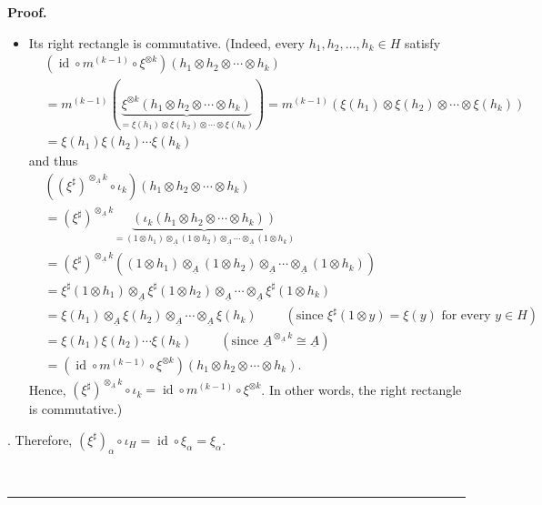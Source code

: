 \documentclass
[numbers=enddot,12pt,final,onecolumn,notitlepage,abstracton]{scrartcl}%
\theoremstyle{definition}
\newenvironment{proof}[1][Proof]{\noindent\textbf{#1.} }{\ \rule{0.5em}{0.5em}}
\begin{document}
\begin{proof}
{\begin{itemize}
\par
\item Its right rectangle is commutative. (Indeed, every $h_{1},h_{2}%
,\ldots,h_{k}\in H$ satisfy%
\begin{align*}
&  \left(  \operatorname*{id}\circ m^{\left(  k-1\right)  }\circ\xi^{\otimes
k}\right)  \left(  h_{1}\otimes h_{2}\otimes\cdots\otimes h_{k}\right) \\
&  =m^{\left(  k-1\right)  }\left(  \underbrace{\xi^{\otimes k}\left(
h_{1}\otimes h_{2}\otimes\cdots\otimes h_{k}\right)  }_{=\xi\left(
h_{1}\right)  \otimes\xi\left(  h_{2}\right)  \otimes\cdots\otimes\xi\left(
h_{k}\right)  }\right)  =m^{\left(  k-1\right)  }\left(  \xi\left(
h_{1}\right)  \otimes\xi\left(  h_{2}\right)  \otimes\cdots\otimes\xi\left(
h_{k}\right)  \right) \\
&  =\xi\left(  h_{1}\right)  \xi\left(  h_{2}\right)  \cdots\xi\left(
h_{k}\right)
\end{align*}
and thus%
\begin{align*}
&  \left(  \left(  \xi^{\sharp}\right)  ^{\otimes_{\underline{A}}k}\circ
\iota_{k}\right)  \left(  h_{1}\otimes h_{2}\otimes\cdots\otimes h_{k}\right)
\\
&  =\left(  \xi^{\sharp}\right)  ^{\otimes_{\underline{A}}k}%
\underbrace{\left(  \iota_{k}\left(  h_{1}\otimes h_{2}\otimes\cdots\otimes
h_{k}\right)  \right)  }_{=\left(  1\otimes h_{1}\right)  \otimes
_{\underline{A}}\left(  1\otimes h_{2}\right)  \otimes_{\underline{A}}%
\cdots\otimes_{\underline{A}}\left(  1\otimes h_{k}\right)  }\\
&  =\left(  \xi^{\sharp}\right)  ^{\otimes_{\underline{A}}k}\left(  \left(
1\otimes h_{1}\right)  \otimes_{\underline{A}}\left(  1\otimes h_{2}\right)
\otimes_{\underline{A}}\cdots\otimes_{\underline{A}}\left(  1\otimes
h_{k}\right)  \right) \\
&  =\xi^{\sharp}\left(  1\otimes h_{1}\right)  \otimes_{\underline{A}}%
\xi^{\sharp}\left(  1\otimes h_{2}\right)  \otimes_{\underline{A}}%
\cdots\otimes_{\underline{A}}\xi^{\sharp}\left(  1\otimes h_{k}\right) \\
&  =\xi\left(  h_{1}\right)  \otimes_{\underline{A}}\xi\left(  h_{2}\right)
\otimes_{\underline{A}}\cdots\otimes_{\underline{A}}\xi\left(  h_{k}\right)
\ \ \ \ \ \ \ \ \ \ \left(  \text{since }\xi^{\sharp}\left(  1\otimes
y\right)  =\xi\left(  y\right)  \text{ for every }y\in H\right) \\
&  =\xi\left(  h_{1}\right)  \xi\left(  h_{2}\right)  \cdots\xi\left(
h_{k}\right)  \ \ \ \ \ \ \ \ \ \ \left(  \text{since }\underline{A}%
^{\otimes_{\underline{A}}k}\cong\underline{A}\right) \\
&  =\left(  \operatorname*{id}\circ m^{\left(  k-1\right)  }\circ\xi^{\otimes
k}\right)  \left(  h_{1}\otimes h_{2}\otimes\cdots\otimes h_{k}\right)  .
\end{align*}
Hence, $\left(  \xi^{\sharp}\right)  ^{\otimes_{\underline{A}}k}\circ\iota
_{k}=\operatorname*{id}\circ m^{\left(  k-1\right)  }\circ\xi^{\otimes k}$. In
other words, the right rectangle is commutative.)
\end{itemize}
}. Therefore, $\left(  \xi^{\sharp}\right)  _{\alpha}\circ\iota_{H}%
=\operatorname*{id}\circ\xi_{\alpha}=\xi_{\alpha}$.


\end{proof}
\end{document}
